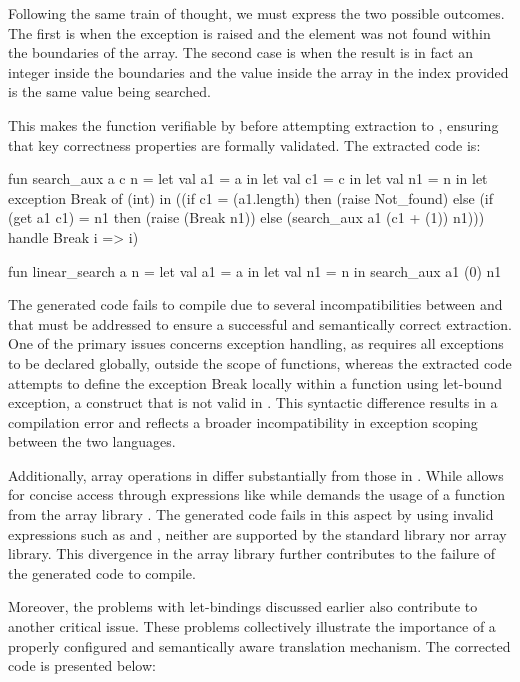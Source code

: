 Following the same train of thought, we must express the two possible outcomes. The first is when the  exception
is raised and the element was not found within the boundaries of the array. The second case is when the result is in fact an integer
inside the boundaries and the value inside the array in the index provided is the same value being searched.

This makes the function verifiable by \whythree before attempting extraction to \cml, ensuring that key correctness properties are 
formally validated. The extracted code is:

\begin{cakeml}
fun search_aux a c n = let val a1 = a in
  let val c1 = c in
  let val n1 = n in
  let exception Break of (int) in
  ((if c1 = (a1.length) then (raise Not_found) 
    else (if (get a1 c1) = n1 then (raise (Break n1)) 
          else (search_aux a1 (c1 + (1)) n1)))
  handle   Break i => i)

fun linear_search a n =
  let val a1 = a in let val n1 = n in search_aux a1 (0) n1
\end{cakeml}

The generated \cml code fails to compile due to several incompatibilities between \ocaml and \cml that must be addressed 
to ensure a successful and semantically correct extraction. One of the primary issues concerns exception handling, as \cml 
requires all exceptions to be declared globally, outside the scope of functions, whereas the extracted code attempts to define 
the exception Break locally within a function using let-bound exception, a construct that is not valid in \cml. This syntactic 
difference results in a compilation error and reflects a broader incompatibility in exception scoping between the two languages.

Additionally, array operations in \cml differ substantially from those in \ocaml. While \ocaml allows for concise access through 
expressions like  while \cml demands the usage of a function from the array library . 
The generated code fails in this aspect by using invalid expressions such as  and , 
neither are supported by the \cml standard library nor array library. This divergence in the array library further contributes 
to the failure of the generated code to compile.

Moreover, the problems with let-bindings discussed earlier also contribute to another critical issue. These problems collectively 
illustrate the importance of a properly configured and semantically aware translation mechanism. The corrected code is presented below:

